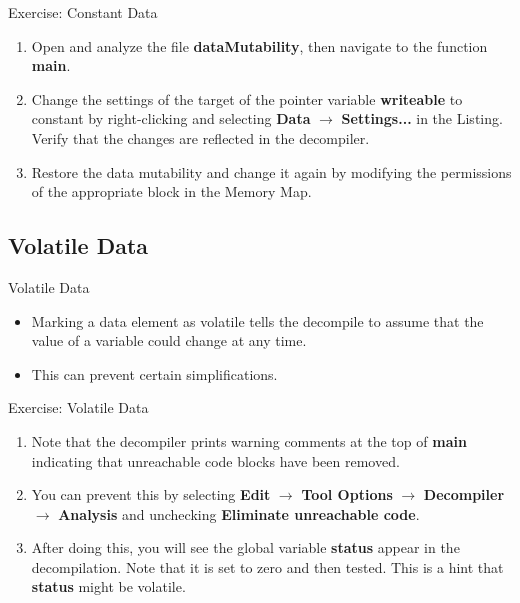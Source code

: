 \documentclass{beamer}
\begin{document}
\begin{frame}
\begin{block}{Exercise: Constant Data}
\begin{enumerate}
\item Open and analyze the file \textbf{dataMutability}, then navigate to the function \textbf{main}.
\item Change the settings of the target of the pointer variable \textbf{writeable} to constant by right-clicking and selecting \textbf{Data} $\rightarrow$ \textbf{Settings...} 
in the Listing.  Verify that the changes are reflected in the decompiler.
\item Restore the data mutability and change it again by modifying the permissions of the appropriate block in the Memory Map. 
\end{enumerate}
\end{block}
\end{frame}

\subsection{Volatile Data}
\begin{frame}
\begin{block}{Volatile Data}
\begin{itemize}
\item Marking a data element as volatile tells the decompile to assume that the value of a variable could change at any time.
\item This can prevent certain simplifications.
\end{itemize}
\end{block}
\end{frame}

\begin{frame}
\begin{block}{Exercise: Volatile Data}
\begin{enumerate}
\item Note that the decompiler prints warning comments at the top of \textbf{main} indicating that unreachable code blocks have been removed.
\item You can prevent this by selecting \textbf{Edit} $\rightarrow$ \textbf{Tool Options} $\rightarrow$ \textbf{Decompiler} $\rightarrow$ \textbf{Analysis} and unchecking
\textbf {Eliminate unreachable code}.
\item After doing this, you will see the global variable \textbf{status} appear in the decompilation.  Note that it is set to zero and then tested.  This is a hint that
\textbf{status} might be volatile.
\end{enumerate}
\end{block}
\end{frame}
\end{document}

